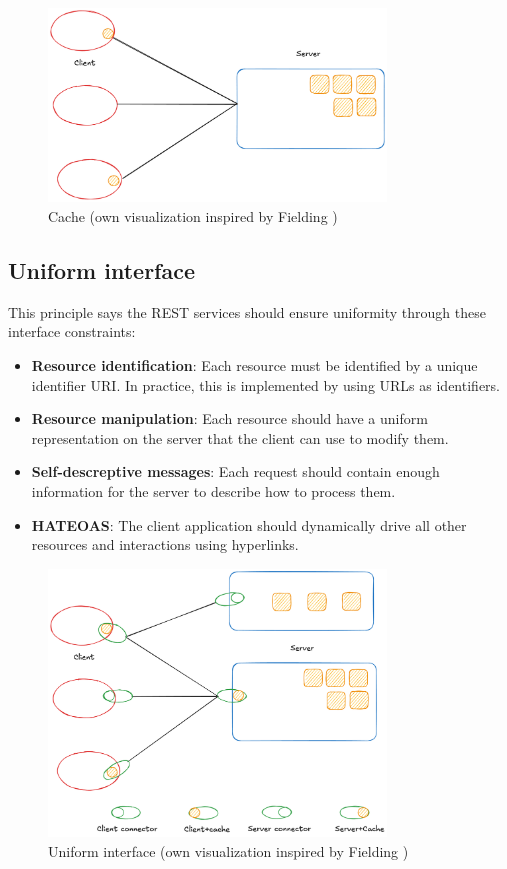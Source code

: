 \begin{figure}[!h]
\centering
\includegraphics[width=0.8\textwidth, keepaspectratio]{figures/cache.png}
\caption{Cache (own visualization inspired by Fielding \cite{fielding2000})}
\label{fig:cache}
\end{figure}

\subsection{Uniform interface}
This principle says the REST services should ensure uniformity through these interface constraints:

\begin{itemize}
\item \textbf{Resource identification}: Each resource must be identified by a unique identifier URI. In practice, this is implemented by using URLs as identifiers.
\item \textbf{Resource manipulation}: Each resource should have a uniform representation on the server that the client can use to modify them.
\item \textbf{Self-descreptive messages}: Each request should contain enough information for the server to describe how to process them.
\item \textbf{HATEOAS}: The client application should dynamically drive all other resources and interactions using hyperlinks.
\end{itemize}

\begin{figure}[!h]
\centering
\includegraphics[width=0.8\textwidth, keepaspectratio]{figures/uniform-interface.png}
\caption{Uniform interface (own visualization inspired by Fielding \cite{fielding2000})}
\label{fig:uniform-interface}
\end{figure}

